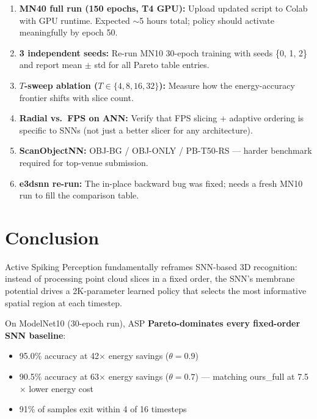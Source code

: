 \documentclass[11pt,a4paper]{article}
\begin{document}
\begin{enumerate}
  \item \textbf{MN40 full run (150 epochs, T4 GPU):} Upload updated script to Colab with
        GPU runtime. Expected $\sim$5 hours total; policy should activate meaningfully
        by epoch 50.

  \item \textbf{3 independent seeds:} Re-run MN10 30-epoch training with seeds
        \{0, 1, 2\} and report mean $\pm$ std for all Pareto table entries.

  \item \textbf{$T$-sweep ablation ($T \in \{4, 8, 16, 32\}$):} Measure how the
        energy-accuracy frontier shifts with slice count.

  \item \textbf{Radial vs.\ FPS on ANN:} Verify that FPS slicing + adaptive ordering
        is specific to SNNs (not just a better slicer for any architecture).

  \item \textbf{ScanObjectNN:} OBJ-BG / OBJ-ONLY / PB-T50-RS --- harder benchmark
        required for top-venue submission.

  \item \textbf{e3dsnn re-run:} The in-place backward bug was fixed; needs a fresh
        MN10 run to fill the comparison table.
\end{enumerate}

\section{Conclusion}

Active Spiking Perception fundamentally reframes SNN-based 3D recognition: instead of processing
point cloud slices in a fixed order, the SNN's membrane potential drives a 2K-parameter learned
policy that selects the most informative spatial region at each timestep.

On ModelNet10 (30-epoch run), ASP \textbf{Pareto-dominates every fixed-order SNN baseline}:
\begin{itemize}
  \item 95.0\% accuracy at 42$\times$ energy savings ($\theta=0.9$)
  \item 90.5\% accuracy at 63$\times$ energy savings ($\theta=0.7$) ---
        matching ours\_full at 7.5$\times$ lower energy cost
  \item 91\% of samples exit within 4 of 16 timesteps
\end{itemize}
\end{document}
